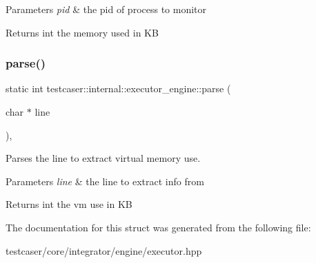 \begin{DoxyParams}{Parameters}
{\em pid} & the pid of process to monitor \\
\hline
\end{DoxyParams}
\begin{DoxyReturn}{Returns}
int the memory used in KB 
\end{DoxyReturn}
\mbox{\label{structtestcaser_1_1internal_1_1executor__engine_a80ed3584cab00a573de09502df329919}} 
\subsubsection{\texorpdfstring{parse()}{parse()}}
{\footnotesize\ttfamily static int testcaser\+::internal\+::executor\+\_\+engine\+::parse (\begin{DoxyParamCaption}\item[{char $\ast$}]{line }\end{DoxyParamCaption})\hspace{0.3cm}{\ttfamily [inline]}, {\ttfamily [static]}}



Parses the line to extract virtual memory use. 


\begin{DoxyParams}{Parameters}
{\em line} & the line to extract info from \\
\hline
\end{DoxyParams}
\begin{DoxyReturn}{Returns}
int the vm use in KB 
\end{DoxyReturn}


The documentation for this struct was generated from the following file\+:\begin{DoxyCompactItemize}
\item 
testcaser/core/integrator/engine/executor.\+hpp\end{DoxyCompactItemize}
